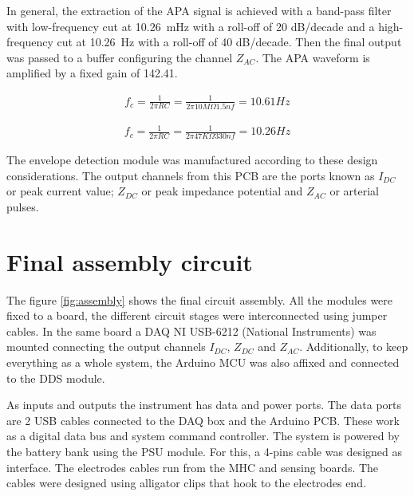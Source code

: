 In general, the extraction of the APA signal is achieved with a band-pass filter with low-frequency cut at \SI{10.26}{\milli\hertz} with a roll-off of \num{20} dB/decade and a high-frequency cut at \SI{10.26}{\Hz} with a roll-off of \num{40} dB/decade. Then the final output was passed to a buffer configuring the channel $Z_{AC}$. The APA waveform is amplified by a fixed gain of \num{142.41}.

\begin{align}
\label{eg:fc2}
f_c = \frac{1}{2 \pi R C} = \frac{1}{2 \pi 10M\Omega 1.5 nf}=10.61Hz
\end{align}

\begin{align}
\label{eg:fc3}
f_c = \frac{1}{2 \pi R C} = \frac{1}{2 \pi 47K\Omega 330nf}=10.26Hz
\end{align}

The envelope detection module was manufactured according to these design considerations. The output channels from this PCB are the ports known as $I_{DC}$ or peak current value; $Z_{DC}$ or peak impedance potential and $Z_{AC}$ or arterial pulses.   



\section{Final assembly circuit}
\label{section design final}
The figure \ref{fig:assembly} shows the final circuit assembly. All the modules were fixed to a board, the different circuit stages were interconnected using jumper cables. In the same board a DAQ NI USB-6212 (National Instruments) was mounted connecting the output channels $I_{DC}$, $Z_{DC}$ and $Z_{AC}$. Additionally, to keep everything as a whole system, the Arduino MCU was also affixed and connected to the DDS module. 

As inputs and outputs the instrument has data and power ports. The data ports are 2 USB cables connected to the DAQ box and the Arduino PCB. These work as a digital data bus and system command controller. The system is powered by the battery bank using the PSU module. For this, a 4-pins cable was designed as interface. The electrodes cables run from the MHC and sensing boards. The cables were designed using alligator clips that hook to the electrodes end. 

